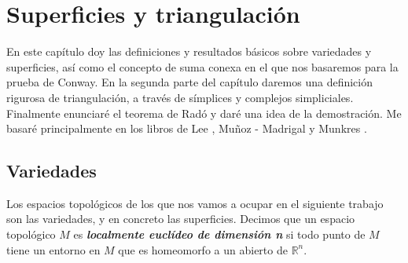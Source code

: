 \documentclass[10pt]{report}
\newcommand{\R}{\mathbb{R}}
\newcommand{\enfatiza}[1]{\textbf{\textit{#1}}}
\theoremstyle{definition}
\begin{document}
\clearpage

\tableofcontents
\clearpage





\chapter{Superficies y triangulación}
\setcounter{page}{1}
En este capítulo doy las definiciones y resultados básicos sobre variedades y superficies, así como el concepto de suma conexa en el que nos basaremos para la prueba de Conway. En la segunda parte del capítulo daremos una definición rigurosa de triangulación, a través de símplices y complejos simpliciales. Finalmente enunciaré el teorema de Radó y daré una idea de la demostración. Me basaré principalmente en los libros de Lee \cite{lee1}, Muñoz - Madrigal \cite{juanjo} y Munkres \cite{munkres}.\\

\section{Variedades}\label{sec:variedades}
Los espacios topológicos de los que nos vamos a ocupar en el siguiente trabajo son las variedades, y en concreto las superficies. Decimos que un espacio topológico $M$ es \enfatiza{localmente euclídeo de dimensión n} si todo punto de $M$ tiene un entorno en $M$ que es homeomorfo a un abierto de $\R^n$.
\end{document}
